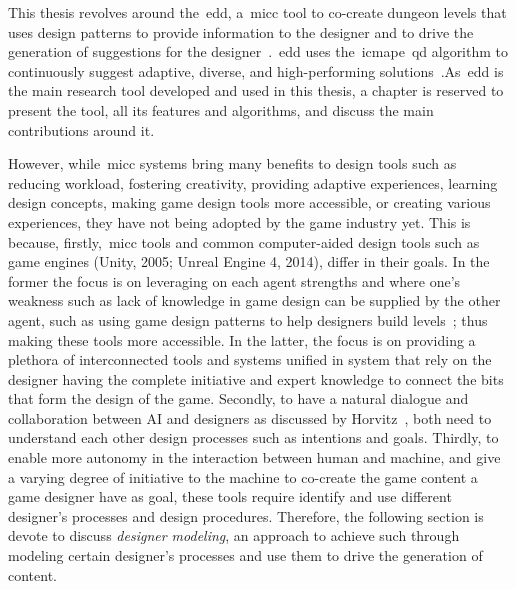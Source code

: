 This thesis revolves around the~\acrfull{edd}, a~\acrshort{micc} tool to co-create dungeon levels that uses design patterns to provide information to the designer and to drive the generation of suggestions for the designer~\cite{alvarez2019empowering}.~\acrshort{edd} uses the~\acrlong{icmape}~\acrshort{qd} algorithm to continuously suggest adaptive, diverse, and high-performing solutions~\cite{Alvarez2020-ICMAPE}.As~\acrshort{edd} is the main research tool developed and used in this thesis, a chapter is reserved to present the tool, all its features and algorithms, and discuss the main contributions around it.



However, while~\acrshort{micc} systems bring many benefits to design tools such as reducing workload, fostering creativity, providing adaptive experiences, learning design concepts, making game design tools more accessible, or creating various experiences, they have not being adopted by the game industry yet. This is because, firstly,~\acrshort{micc} tools and common computer-aided design tools such as game engines (Unity, 2005; Unreal Engine 4, 2014), differ in their goals. In the former the focus is on leveraging on each agent strengths and where one's weakness such as lack of knowledge in game design can be supplied by the other agent, such as using game design patterns to help designers build levels~\cite{Baldwin2017a,dahlskog2014-PCGDesignPatterns}; thus making these tools more accessible. In the latter, the focus is on providing a plethora of interconnected tools and systems unified in system that rely on the designer having the complete initiative and expert knowledge to connect the bits that form the design of the game. Secondly, to have a natural dialogue and collaboration between AI and designers as discussed by Horvitz~\cite{Horvitz99-uncertainty}, both need to understand each other design processes such as intentions and goals. Thirdly, to enable more autonomy in the interaction between human and machine, and give a varying degree of initiative to the machine to co-create the game content a game designer have as goal, these tools require identify and use different designer's processes and design procedures. Therefore, the following section is devote to discuss \textit{designer modeling}, an approach to achieve such through modeling certain designer's processes and use them to drive the generation of content. 

